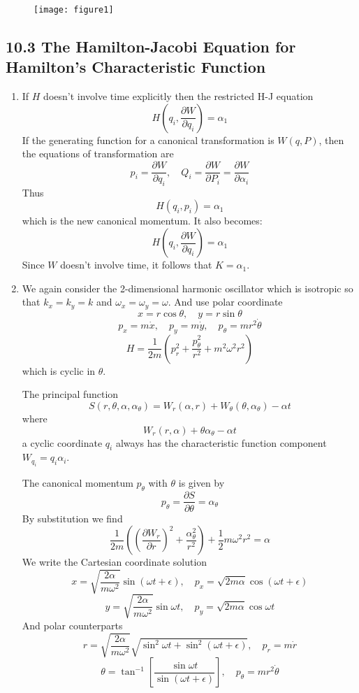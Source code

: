 \documentclass{article}
\begin{document}
	\begin{figure}[h]
		\centering
		\texttt{[image: figure1]}
		\caption{}
		\label{fig:figure1}
	\end{figure}
	
	\subsection{10.3 The Hamilton-Jacobi Equation for Hamilton's Characteristic Function}
	\begin{enumerate}
		\item If $H$ doesn't involve time explicitly then the restricted H-J equation
		\[
		H(q_i, \frac{\partial W}{\partial q_i}) = \alpha_1
		\]
		If the generating function for a canonical transformation is $W(q, P)$, then the equations of transformation are
		\[
		p_i = \frac{\partial W}{\partial q_i}, \quad Q_i = \frac{\partial W}{\partial P_i} = \frac{\partial W}{\partial \alpha_i}
		\]
		Thus
		\[
		H(q_i, p_i) = \alpha_1
		\]
		which is the new canonical momentum.
		It also becomes:
		\[
		H(q_i, \frac{\partial W}{\partial q_i}) = \alpha_1
		\]
		Since $W$ doesn't involve time, it follows that $K = \alpha_1$.
		
		\item We again consider the 2-dimensional harmonic oscillator which is isotropic so that $k_x = k_y = k$ and $\omega_x = \omega_y = \omega$.
		And use polar coordinate
		\[
		x = r\cos\theta, \quad y = r\sin\theta
		\]
		\[
		p_x = m\dot{x}, \quad p_y = m\dot{y}, \quad p_\theta = mr^2\dot{\theta}
		\]
		\[
		H = \frac{1}{2m}(p_r^2 + \frac{p_\theta^2}{r^2} + m^2\omega^2 r^2)
		\]
		which is cyclic in $\theta$.
		
		The principal function
		\[
		S(r, \theta, \alpha, \alpha_\theta) = W_r(\alpha, r) + W_\theta(\theta, \alpha_\theta) - \alpha t
		\]
		where
		\[
		W_r(r, \alpha) + \theta \alpha_\theta - \alpha t
		\]
		a cyclic coordinate $q_i$ always has the characteristic function component $W_{q_i} = q_i \alpha_i$.
		
		The canonical momentum $p_\theta$ with $\theta$ is given by
		\[
		p_\theta = \frac{\partial S}{\partial \theta} = \alpha_\theta
		\]
		By substitution we find
		\[
		\frac{1}{2m} \left( (\frac{\partial W_r}{\partial r})^2 + \frac{\alpha_\theta^2}{r^2} \right) + \frac{1}{2}m\omega^2 r^2 = \alpha
		\]
		We write the Cartesian coordinate solution
		\[
		x = \sqrt{\frac{2\alpha}{m\omega^2}}\sin(\omega t + \epsilon), \quad p_x = \sqrt{2m\alpha}\cos(\omega t + \epsilon)
		\]
		\[
		y = \sqrt{\frac{2\alpha}{m\omega^2}}\sin\omega t, \quad p_y = \sqrt{2m\alpha}\cos\omega t
		\]
		And polar counterparts
		\[
		r = \sqrt{\frac{2\alpha}{m\omega^2}}\sqrt{\sin^2\omega t + \sin^2(\omega t+\epsilon)}, \quad p_r = m\dot{r}
		\]
		\[
		\theta = \tan^{-1}\left[\frac{\sin\omega t}{\sin(\omega t+\epsilon)}\right], \quad p_\theta = mr^2\dot{\theta}
		\]
		

\end{enumerate}
\end{document}

